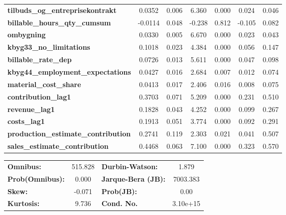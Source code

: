 \begin{center}
\begin{tabular}{lcccccc}
\textbf{tilbuds\_og\_entreprisekontrakt}    &       0.0352  &        0.006     &     6.360  &         0.000        &        0.024    &        0.046     \\
\textbf{billable\_hours\_qty\_cumsum}       &      -0.0114  &        0.048     &    -0.238  &         0.812        &       -0.105    &        0.082     \\
\textbf{ombygning}                          &       0.0330  &        0.005     &     6.670  &         0.000        &        0.023    &        0.043     \\
\textbf{kbyg33\_no\_limitations}            &       0.1018  &        0.023     &     4.384  &         0.000        &        0.056    &        0.147     \\
\textbf{billable\_rate\_dep}                &       0.0726  &        0.013     &     5.611  &         0.000        &        0.047    &        0.098     \\
\textbf{kbyg44\_employment\_expectations}   &       0.0427  &        0.016     &     2.684  &         0.007        &        0.012    &        0.074     \\
\textbf{material\_cost\_share}              &       0.0413  &        0.017     &     2.406  &         0.016        &        0.008    &        0.075     \\
\textbf{contribution\_lag1}                 &       0.3703  &        0.071     &     5.209  &         0.000        &        0.231    &        0.510     \\
\textbf{revenue\_lag1}                      &       0.1828  &        0.043     &     4.252  &         0.000        &        0.099    &        0.267     \\
\textbf{costs\_lag1}                        &       0.1913  &        0.051     &     3.774  &         0.000        &        0.092    &        0.291     \\
\textbf{production\_estimate\_contribution} &       0.2741  &        0.119     &     2.303  &         0.021        &        0.041    &        0.507     \\
\textbf{sales\_estimate\_contribution}      &       0.4468  &        0.063     &     7.100  &         0.000        &        0.323    &        0.570     \\
\bottomrule
\end{tabular}
\begin{tabular}{lclc}
\textbf{Omnibus:}       & 515.828 & \textbf{  Durbin-Watson:     } &    1.879  \\
\textbf{Prob(Omnibus):} &   0.000 & \textbf{  Jarque-Bera (JB):  } & 7003.383  \\
\textbf{Skew:}          &  -0.071 & \textbf{  Prob(JB):          } &     0.00  \\
\textbf{Kurtosis:}      &   9.736 & \textbf{  Cond. No.          } & 3.10e+15  \\
\bottomrule
\end{tabular}
\end{center}

